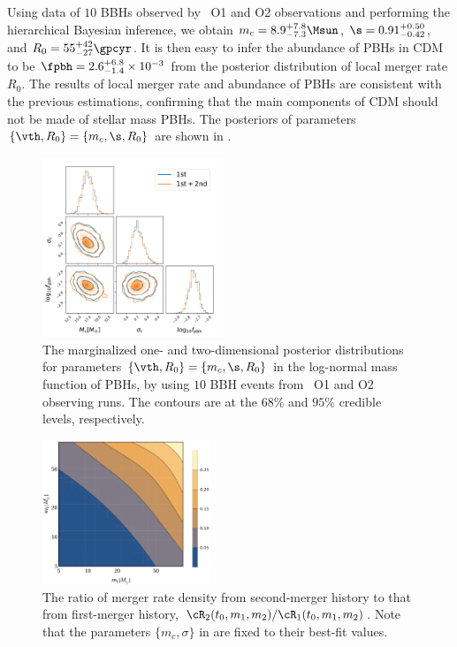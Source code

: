 \documentclass[
reprint,           %
superscriptaddress,%
amsmath,           %
amssymb,           %
aps,               %
prd,               %
notitlepage,       %
longbibliography,  %
floatfix,          %
showkeys,          %
]{revtex4-1}
\begin{document}
Using data of $10$ BBHs observed by \lvc\ O1 and O2 observations and performing
the hierarchical Bayesian inference, we obtain $m_c =8.9^{+7.8}_{-7.3} \Msun$,
$\s = 0.91^{+0.50}_{-0.42}$, and $R_0 = 55^{+42}_{-27} \gpcyr$.
It is then easy to infer the abundance of PBHs in CDM to be 
$\fpbh = 2.6^{+6.8}_{-1.4} \times 10^{-3}$ from the posterior distribution of 
local merger rate $R_0$.
The results of local merger rate and abundance of PBHs are consistent with
the previous estimations, confirming that the main components of CDM should
not be made of stellar mass PBHs.
The posteriors of parameters $\{\vth, R_0\} = \{m_c, \s, R_0\}$ are shown 
in .
\begin{figure}[htbp!]
	\centering
	\includegraphics[width = 0.48\textwidth]{post-log.pdf}
	\caption{\label{posterior-log}
		The marginalized one- and two-dimensional posterior distributions for 
		parameters $\{\vth, R_0\} = \{m_c, \s, R_0\}$ in the log-normal mass function of PBHs, by using $10$ BBH events from \lvc\ O1 and O2 observing runs.
		The contours are at the $68\%$ and $95\%$ credible levels, respectively. 
	}
\end{figure}

\begin{figure}[htbp!]
	\centering
	\includegraphics[width = 0.45\textwidth]{ratio-log.pdf}
	\caption{\label{ratio-log}
		The ratio of merger rate density from second-merger history
		to that from first-merger history,
		$\cR_2(t_0, m_1, m_2)/\cR_1(t_0, m_1, m_2)$. Note that the parameters $\{m_c, \sigma\}$ in  are fixed to their best-fit values.
	}
\end{figure}
\end{document}
